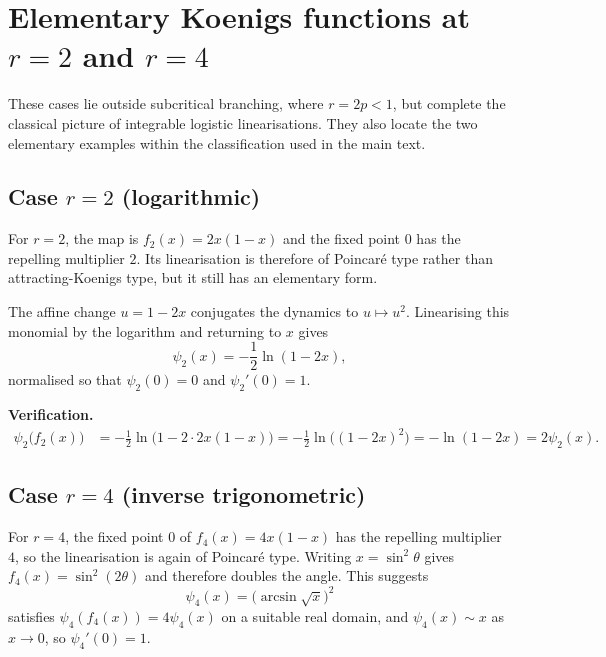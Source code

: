 \section{Elementary Koenigs functions at \texorpdfstring{$r=2$ and $r=4$}{r=2 and r=4}}
\label{a:app:integrable}

These cases lie outside subcritical branching, where $r=2p<1$, but complete the
classical picture of integrable logistic linearisations.  They also locate the two
elementary examples within the classification used in the main text.

\subsection{Case \texorpdfstring{$r=2$}{r=2} (logarithmic)}

For $r=2$, the map is $f_2(x)=2x(1-x)$ and the fixed point $0$ has the
repelling multiplier $2$.  Its linearisation is therefore of Poincar\'e type rather
than attracting-Koenigs type, but it still has an elementary form.

The affine change $u=1-2x$ conjugates the dynamics to $u\mapsto u^2$.
Linearising this monomial by the logarithm and returning to $x$ gives
\begin{equation}
\label{a:eq:phi2}
\psi_2(x)=-\frac12\ln(1-2x),
\end{equation}
normalised so that $\psi_2(0)=0$ and $\psi_2'(0)=1$.

\textbf{Verification.}
\begin{align*}
\psi_2\bigl(f_2(x)\bigr)
&=
-\frac12\ln\bigl(1-2\cdot 2x(1-x)\bigr)
=
-\frac12\ln\bigl((1-2x)^2\bigr)
=
-\ln(1-2x)
=
2\psi_2(x).
\end{align*}

\subsection{Case \texorpdfstring{$r=4$}{r=4} (inverse trigonometric)}

For $r=4$, the fixed point $0$ of $f_4(x)=4x(1-x)$ has the repelling multiplier
$4$, so the linearisation is again of Poincar\'e type.  Writing
$x=\sin^2\theta$ gives $f_4(x)=\sin^2(2\theta)$ and therefore doubles the angle.
This suggests
\begin{equation}
\label{a:eq:phi4}
\psi_4(x)=\bigl(\arcsin\sqrt{x}\bigr)^2
\end{equation}
satisfies $\psi_4(f_4(x))=4\psi_4(x)$ on a suitable real domain, and $\psi_4(x)\sim x$ as $x\to0$, so $\psi_4'(0)=1$.

